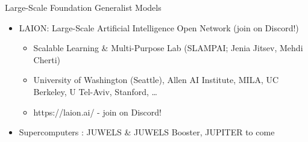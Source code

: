 \begin{frame}{Large-Scale Foundation Generalist Models}
\protect\hypertarget{large-scale-foundation-generalist-models-3}{}
\begin{itemize}
\tightlist
\item
  LAION: Large-Scale Artificial Intelligence Open Network (join on
  Discord!)

  \begin{itemize}
  \tightlist
  \item
    Scalable Learning \& Multi-Purpose Lab (SLAMPAI; Jenia Jitsev, Mehdi
    Cherti)
  \item
    University of Washington (Seattle), Allen AI Institute, MILA, UC
    Berkeley, U Tel-Aviv, Stanford, \ldots{}
  \item
    https://laion.ai/ - join on Discord!
  \end{itemize}
\item
  Supercomputers : JUWELS \& JUWELS Booster, JUPITER to come
\end{itemize}

\end{frame}

